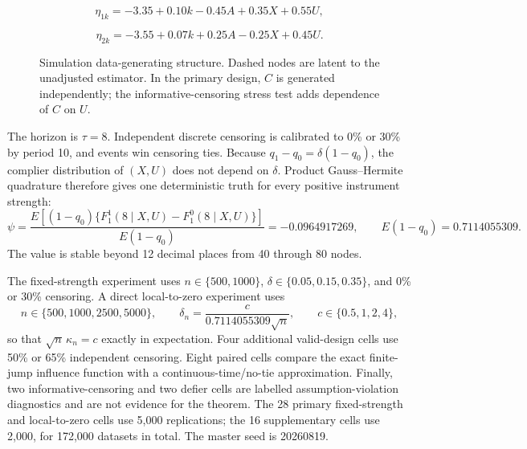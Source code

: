 \documentclass[
  10pt,
  letterpaper,
]{article}
\begin{document}
\[
\eta_{1k}=-3.35+0.10k-0.45A+0.35X+0.55U,
\]

\[
\eta_{2k}=-3.55+0.07k+0.25A-0.25X+0.45U.
\]

\begin{figure}[tbp]
\centering
{}
\caption{Simulation data-generating structure. Dashed nodes are latent
to the unadjusted estimator. In the primary design, $C$ is generated
independently; the informative-censoring stress test adds dependence of
$C$ on $U$.}
\label{fig:dag}
\end{figure}

The horizon is $\tau=8$. Independent discrete censoring is calibrated
to 0\% or 30\% by period 10, and events win censoring ties. Because
$q_1-q_0=\delta(1-q_0)$, the complier distribution of $(X,U)$ does not
depend on $\delta$. Product Gauss--Hermite quadrature therefore gives
one deterministic truth for every positive instrument strength:
\[
\psi=\frac{E[(1-q_0)\{F_1^1(8\mid X,U)-F_1^0(8\mid X,U)\}]}
{E(1-q_0)}=-0.0964917269,
\qquad E(1-q_0)=0.7114055309.
\]
The value is stable beyond 12 decimal places from 40 through 80 nodes.

The fixed-strength experiment uses $n\in\{500,1000\}$,
$\delta\in\{0.05,0.15,0.35\}$, and 0\% or 30\% censoring. A direct
local-to-zero experiment uses
\[
n\in\{500,1000,2500,5000\},\qquad
\delta_n=\frac{c}{0.7114055309\sqrt n},\qquad
c\in\{0.5,1,2,4\},
\]
so that $\sqrt n\,\kappa_n=c$ exactly in expectation. Four additional
valid-design cells use 50\% or 65\% independent censoring. Eight paired
cells compare the exact finite-jump influence function with a
continuous-time/no-tie approximation. Finally, two informative-censoring
and two defier cells are labelled assumption-violation diagnostics and
are not evidence for the theorem. The 28 primary fixed-strength and
local-to-zero cells use 5,000 replications; the 16 supplementary cells
use 2,000, for 172,000 datasets in total. The master seed is 20260819.
\end{document}
